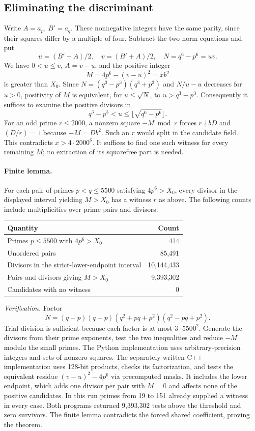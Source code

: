 \subsection{Eliminating the discriminant}
Write $A=a_p$, $B'=a_q$. These nonnegative integers have the same parity, since their squares differ by a multiple of four. Subtract the two norm equations and put
\[
   u=(B'-A)/2,\quad v=(B'+A)/2,\quad
   N=q^6-p^6=uv.
\]
We have $0<u\le v$, $A=v-u$, and the positive integer
\[
                M=4p^6-(v-u)^2=x b^2
\]
is greater than $X_0$. Since $N=(q^3-p^3)(q^3+p^3)$ and $N/u-u$ decreases for $u>0$, positivity of $M$ is equivalent, for $u\le\sqrt N$, to $u>q^3-p^3$. Consequently it suffices to examine the positive divisors in
\[
       q^3-p^3<u\le\lfloor\sqrt{q^6-p^6}\rfloor .
\]
For an odd prime $r\le2000$, a nonzero square $-M\bmod r$ forces $r\nmid bD$ and $(D/r)=1$ because $-M=D b^2$. Such an $r$ would split in the candidate field. This contradicts $x>4\cdot2000^6$. It suffices to find one such witness for every remaining $M$; no extraction of its squarefree part is needed.

\paragraph{Finite lemma.} For each pair of primes $p<q\le5500$ satisfying $4p^6>X_0$, every divisor in the displayed interval yielding $M>X_0$ has a witness $r$ as above. The following counts include multiplicities over prime pairs and divisors.
\begin{center}
\begin{tabular}{lr}\toprule
Quantity & Count\\\midrule
Primes $p\le5500$ with $4p^6>X_0$ &414\\
Unordered pairs &85,491\\
Divisors in the strict-lower-endpoint interval &10,144,433\\
Pairs and divisors giving $M>X_0$ &9,393,302\\
Candidates with no witness &0\\\bottomrule
\end{tabular}
\end{center}
\textit{Verification.} Factor
\[
 N=(q-p)(q+p)(q^2+pq+p^2)(q^2-pq+p^2).
\]
Trial division is sufficient because each factor is at most $3\cdot5500^2$. Generate the divisors from their prime exponents, test the two inequalities and reduce $-M$ modulo the small primes. The Python implementation uses arbitrary-precision integers and sets of nonzero squares. The separately written C++ implementation uses 128-bit products, checks its factorization, and tests the equivalent residue $(v-u)^2-4p^6$ via precomputed masks. It includes the lower endpoint, which adds one divisor per pair with $M=0$ and affects none of the positive candidates. In this run primes from 19 to 151 already supplied a witness in every case. Both programs returned 9,393,302 tests above the threshold and zero survivors. The finite lemma contradicts the forced shared coefficient, proving the theorem.


